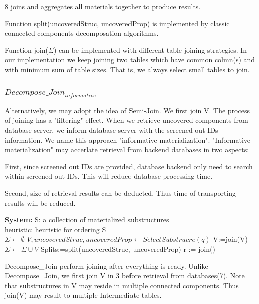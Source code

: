 8 joins and aggregates all materials together to produce results. 

Function split(uncoveredStruc, uncoveredProp) is implemented by classic connected components decomposation algorithms.

Function join($\Sigma$) can be implemented with  different table-joining strategies. In our implementation we keep joining two tables which have common colmn(s) and with minimum sum of table sizes. That is, we always select small tables to join.  

\subsubsection{$Decompose\_Join_{informative}$}
Alternatively, we may adopt the idea of Semi-Join. We first join V. The process of joining has a "filtering" effect. When we retrieve uncovered components from database server, we inform database server with the screened out IDs information. We name this approach "informative materialization". "Informative materialization" may accerlate retrieval from backend databases in two aspects:

First, since screened out IDs are provided, database backend only need to search within screened out IDs. This will reduce database processing time.

Second, size of retrieval results can be deducted. Thus time of transporting results will be reduced. 


\begin{algorithm}[H]
	\caption{$Decompose\_Join_{informative}$}
	\LinesNumbered
	\textbf{System:} S: a collection of materialized substructures\\ heuristic: heuristic for ordering S\\
	$\Sigma \gets \emptyset $\;
	$V, uncoveredStruc, uncoveredProp \gets SelectSubstrucre(q) $\;
	V:=join(V)\;
	$\Sigma \gets \Sigma \cup V $\;
	Splits:=split(uncoveredStruc, uncoveredProp)\;
	r := join(\Sigma)\;
\end{algorithm}
\clearpage

Decompose\_Join perform joining after everything is ready. Unlike Decompose\_Join, we first join V in 3 before retrieval from databases(7). Note that substructures in V may reside in multiple connected components. Thus join(V) may result to multiple Intermediate tables.

